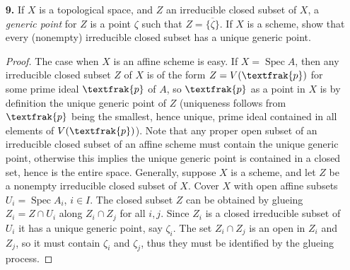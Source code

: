 \documentclass{article}
\newcommand{\goth}[1]{\textfrak{#1}}
\DeclareMathOperator{\spec}{Spec}
\begin{document}
\begin{enumerate} [label=\textbf{\arabic*.}, leftmargin=0em]
\begin{proof}
    We first identify the prime ideals of $k[\varepsilon] / (\varepsilon^2)$ and determine the topology of $\spec{k[\varepsilon] / (\varepsilon^2)}$. The only prime ideal is $(\varepsilon)$, in particular it is a local ring with nilpotent elements, so $\spec{k[\varepsilon] / (\varepsilon^2)}$ has only one point. We have the canonical projection $k[\varepsilon] / (\varepsilon^2) \to k$, which given a morphism of schemes $d : \spec{k[\varepsilon] / (\varepsilon^2)} \to X$ induces
    \begin{equation*}
        \spec{k} \to \spec{k[\varepsilon] / (\varepsilon^2)} \to X.
    \end{equation*}
    By Exercise 7, this is equivalent to giving a point $x \in X$ and an inclusion of fields $k(x) \hookrightarrow k$. Also, any $d$ induces a morphism between tangent spaces $$d^* : T_{(\varepsilon)}(\spec{k[\varepsilon]/(\varepsilon^2)}) \to T_x(X),$$
    and since $T_{(\varepsilon)}(\spec{k[\varepsilon]/(\varepsilon^2)})$ is a one-dimensional $k$-vector space, a linear map such as $d^*$ is equivalent to giving an element of $T_x(X)$.
\end{proof}

\item[\textbf{9.}] If $X$ is a topological space, and $Z$ an irreducible closed subset of $X$, a \textit{generic point} for $Z$ is a point $\zeta$ such that $Z = \overline{\{ \zeta \} }$. If $X$ is a scheme, show that every (nonempty) irreducible closed subset has a unique generic point.

\begin{proof}
   The case when $X$ is an affine scheme is easy. If $X = \spec{A}$, then any irreducible closed subset $Z$ of $X$ is of the form $Z = V(\goth{p})$ for some prime ideal $\goth{p}$ of $A$, so $\goth{p}$ as a point in $X$ is by definition the unique generic point of $Z$ (uniqueness follows from $\goth{p}$ being the smallest, hence unique, prime ideal contained in all elements of $V(\goth{p})$). Note that any proper open subset of an irreducible closed subset of an affine scheme must contain the unique generic point, otherwise this implies the unique generic point is contained in a closed set, hence is the entire space. Generally, suppose $X$ is a scheme, and let $Z$ be a nonempty irreducible closed subset of $X$. Cover $X$ with open affine subsets $U_i = \spec{A_i}$, $i \in I$. The closed subset $Z$ can be obtained by glueing $Z_i = Z \cap U_i$ along $Z_i \cap Z_j$ for all $i, j$. Since $Z_i$ is a closed irreducible subset of $U_i$ it has a unique generic point, say $\zeta_i$. The set $Z_i \cap Z_j$ is an open in $Z_i$ and $Z_j$, so it must contain $\zeta_i$ and $\zeta_j$, thus they must be identified by the glueing process.
\end{proof}


\end{enumerate}
\end{document}
